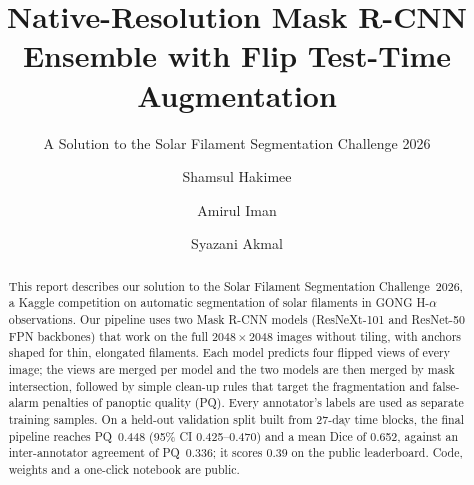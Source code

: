\documentclass[sigconf]{acmart}
\begin{document}
\title{Native-Resolution Mask R-CNN Ensemble with Flip Test-Time Augmentation}

\subtitle{A Solution to the Solar Filament Segmentation Challenge 2026} %


\author{Shamsul Hakimee}

\author{Amirul Iman}

\author{Syazani Akmal}


\begin{abstract}
    This report describes our solution to the Solar Filament Segmentation Challenge~2026, a Kaggle competition on automatic segmentation of solar filaments in GONG H-$\alpha$ observations.
Our pipeline uses two Mask R-CNN models (ResNeXt-101 and ResNet-50 FPN
backbones) that work on the full $2048\times2048$ images without tiling,
with anchors shaped for thin, elongated filaments. Each model predicts
four flipped views of every image; the views are merged per model and the
two models are then merged by mask intersection, followed by simple
clean-up rules that target the fragmentation and false-alarm penalties
of panoptic quality (PQ). Every annotator's labels are used as separate
training samples. On a held-out validation split built from 27-day time
blocks, the final pipeline reaches PQ~0.448 (95\% CI 0.425--0.470) and a
mean Dice of 0.652, against an inter-annotator agreement of PQ~0.336;
it scores 0.39 on the public leaderboard. Code, weights and a one-click
notebook are public.
\end{abstract}


\maketitle

\ifguideStyle
{}
\par\medskip
\fi
\end{document}
